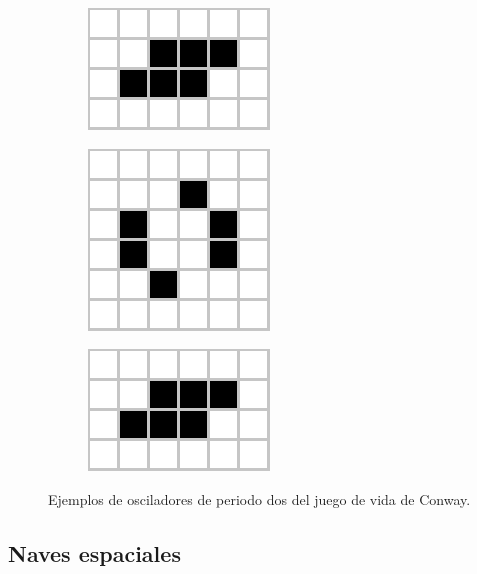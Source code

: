 \documentclass[../proyecto.tex]{memoir}
\begin{document}
\begin{figure}[H]
\begin{subfigure}[b]{0.3\linewidth}
        \includegraphics[height=0.35\linewidth]{./images/toad1.png}
        \caption{}
        \label{fig:toad1}
    \end{subfigure}
	\begin{subfigure}[b]{0.3\linewidth} 
        \centering
        \includegraphics[height=0.45\linewidth]{./images/toad2.png}
        \caption{}
        \label{fig:toad2}
    \end{subfigure}
	\begin{subfigure}[b]{0.3\linewidth} 
        \centering
        \includegraphics[height=0.35\linewidth]{./images/toad3.png}
        \caption{}
        \label{fig:toad3}
    \end{subfigure}
	\caption{Ejemplos de osciladores de periodo dos del juego de vida de Conway.}
	\label{fig:congIniciales3}
\end{figure} 

\subsection{Naves espaciales}
\end{document}
